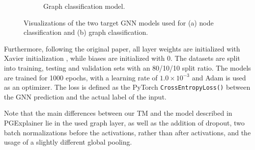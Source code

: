 \begin{figure}[htbp]
\begin{subfigure}[t]{0.48\textwidth}
        \caption{Graph classification model.}
        \label{fig:graph-classification}
    \end{subfigure}
    \caption{Visualizations of the two target GNN models used for (a) node classification and (b) graph classification.}
    \label{fig:gnn-models}
\end{figure}

Furthermore, following the original paper, all layer weights are initialized with Xavier initialization \cite{glorot2010understanding}, while biases are initialized with $0$. The datasets are split into training, testing and validation sets with an 80/10/10 split ratio. The models are trained for 1000 epochs, with a learning rate of $1.0 \times 10^{-3}$ and Adam \cite{kingma2014adam} is used as an optimizer. The loss is defined as the PyTorch \lstinline|CrossEntropyLoss()| between the GNN prediction and the actual label of the input. \bigskip

Note that the main differences between our \ac{TM} and the model described in PGExplainer \cite{luo2020parameterized} lie in the used graph layer, as well as the addition of dropout, two batch normalizations before the activations, rather than after activations, and the usage of a slightly different global pooling.

